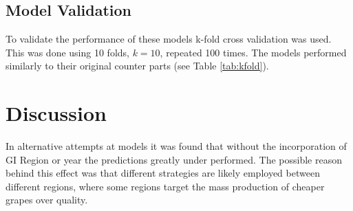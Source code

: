 \documentclass[review,12pt,authoryear]{elsarticle}
\begin{document}
\begin{linenumbers}
\subsection{Model Validation}
To validate the performance of these models k-fold cross validation was used. This was done using 10 folds, $k=10$, repeated 100 times. The models performed similarly to their original counter parts (see Table \ref*{tab:kfold}).
\begin{table}[]
  \label{tab:kfold}
  \caption{Model validation using k-fold cross validation, for 10 folds repeated 100 times.}
  \end{table}
\section{Discussion}
% 
%
%
In alternative attempts at models it was found that without the incorporation of GI Region or year the predictions greatly under performed. The possible reason behind this effect was that different strategies are likely employed between different regions, where some regions target the mass production of cheaper grapes over quality. %
%

\end{linenumbers}
\end{document}
